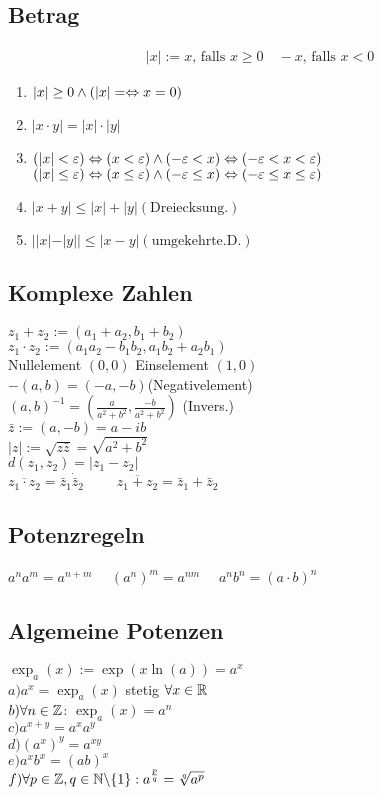 \subsection*{Betrag}
\begin{align*}
    |x| := 
    x \text{, falls } x \geq 0\quad
    -x \text{, falls } x < 0
\end{align*}
\begin{enumerate}[label=\alph*., noitemsep]
    \item $|x| \geq 0 \land (|x| = \Leftrightarrow x = 0)$
    \item $|x \cdot y| = |x| \cdot |y|$
    \item $(|x| < \varepsilon) \Leftrightarrow (x < \varepsilon) \land (-\varepsilon < x) \Leftrightarrow (-\varepsilon < x < \varepsilon)$\\
          $(|x| \leq \varepsilon) \Leftrightarrow (x \leq \varepsilon) \land (-\varepsilon \leq x) \Leftrightarrow (-\varepsilon \leq x \leq \varepsilon)$
    \item $|x + y| \leq |x| + |y| (\text{Dreiecksung.})$
    \item $||x| - |y|| \leq |x - y| (\text{umgekehrte.D.})$
\end{enumerate}
\subsection*{Komplexe Zahlen}
$z_1 + z_2 := (a_1 + a_2, b_1 + b_2)$\\
$z_1 \cdot z_2 := (a_1a_2 - b_1b_2, a_1b_2 + a_2b_1)$\\
Nullelement $(0,0)$
Einselement $(1, 0)$\\
$-(a, b) = (-a, -b)$(Negativelement)\\
$(a, b)^{-1} = \left(\frac{a}{a^2 + b^2}, \frac{-b}{a^2 + b^2}\right)$ (Invers.)\\
$\bar z := (a, -b) = a - ib$\\
$|z| := \sqrt{z \bar z} = \sqrt{a^2 + b^2}$\\
$d(z_1, z_2) = |z_1 - z_2|$\\
$\overline{z_1 \cdot z_2} = \bar z_1 \dot \bar z_2 \quad\quad$
$\overline{z_1 + z_2} = \bar z_1 + \bar z_2$
\subsection*{Potenzregeln}
$a^n a^m = a^{n + m}\quad$
$(a^n)^m = a^{nm}\quad$
$a^n b^n = (a \cdot b)^n$
\subsection*{Algemeine Potenzen}
$\exp_a(x) := \exp(x \ln(a)) = a^x$\\
$a) a^x = \exp_a(x)$ stetig $\forall x \in \mathbb R$\\
$b) \forall n \in \mathbb Z$: $\exp_a(x) = a^n$\\
$c) a^{x+y} = a^x a^y$\\
$d) (a^x)^y = a^{xy}$\\
$e) a^x b^x = (ab)^x$\\
$f) \forall p \in \mathbb Z, q \in \mathbb N\backslash\{1\}: a^{\frac{p}{q}} = \sqrt[q]{a^p}$

